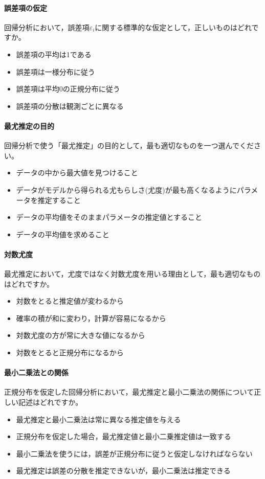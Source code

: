 \documentclass{ltjbook}
\begin{document}
\paragraph{誤差項の仮定}
回帰分析において，誤差項$\varepsilon_i$に関する標準的な仮定として，正しいものはどれですか。
\begin{itemize}
	\item 誤差項の平均は1である
	\item 誤差項は一様分布に従う
	\item 誤差項は平均0の正規分布に従う
	\item 誤差項の分散は観測ごとに異なる
\end{itemize}

\paragraph{最尤推定の目的}
回帰分析で使う「最尤推定」の目的として，最も適切なものを一つ選んでください。
\begin{itemize}
	\item データの中から最大値を見つけること
	\item データがモデルから得られる尤もらしさ(尤度)が最も高くなるようにパラメータを推定すること
	\item データの平均値をそのままパラメータの推定値とすること
	\item データの平均値を求めること
\end{itemize}

\paragraph{対数尤度}
最尤推定において，尤度ではなく対数尤度を用いる理由として，最も適切なものはどれですか。
\begin{itemize}
	\item 対数をとると推定値が変わるから
	\item 確率の積が和に変わり，計算が容易になるから
	\item 対数尤度の方が常に大きな値になるから
	\item 対数をとると正規分布になるから
\end{itemize}

\paragraph{最小二乗法との関係}
正規分布を仮定した回帰分析において，最尤推定と最小二乗法の関係について正しい記述はどれですか。
\begin{itemize}
	\item 最尤推定と最小二乗法は常に異なる推定値を与える
	\item 正規分布を仮定した場合，最尤推定値と最小二乗推定値は一致する
	\item 最小二乗法を使うには，誤差が正規分布に従うと仮定しなければならない
	\item 最尤推定は誤差の分散を推定できないが，最小二乗法は推定できる
\end{itemize}
\end{document}
